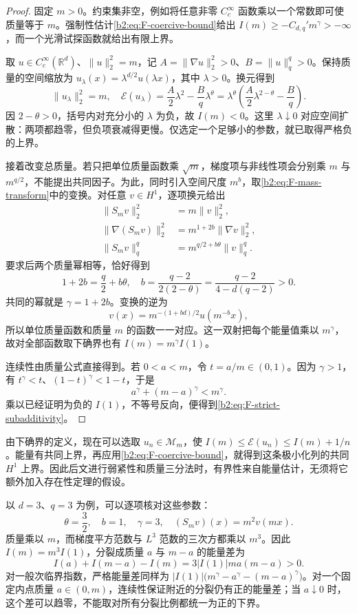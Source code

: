 \begin{proof}
固定 \(m>0\)。约束集非空，例如将任意非零 \(C_c^\infty\) 函数乘以一个常数即可使质量等于 \(m\)。强制性估计\eqref{b2:eq:F-coercive-bound}给出 \(I(m)\ge-C_{d,q}'m^\gamma> -\infty\)，而一个光滑试探函数就给出有限上界。

取 \(u\in C_c^\infty(\mathbb R^d)\)、\(\|u\|_2^2=m\)，记
\(A=\|\nabla u\|_2^2>0\)、\(B=\|u\|_q^q>0\)。保持质量的空间缩放为
\(u_\lambda(x)=\lambda^{d/2}u(\lambda x)\)，其中 \(\lambda>0\)。换元得到
\[
 \|u_\lambda\|_2^2=m,
 \quad
 \mathcal E(u_\lambda)=\frac A2\lambda^2-\frac Bq\lambda^\theta
 =\lambda^\theta\left(\frac A2\lambda^{2-\theta}-\frac Bq\right).
\]
因 \(2-\theta>0\)，括号内对充分小的 \(\lambda\) 为负，故 \(I(m)<0\)。这里 \(\lambda\downarrow0\) 对应空间扩散：两项都趋零，但负项衰减得更慢。仅选定一个足够小的参数，就已取得严格负的上界。

接着改变总质量。若只把单位质量函数乘 \(\sqrt m\)，梯度项与非线性项会分别乘 \(m\) 与 \(m^{q/2}\)，不能提出共同因子。为此，同时引入空间尺度 \(m^b\)，取\eqref{b2:eq:F-mass-transform}中的变换。对任意 \(v\in H^1\)，逐项换元给出
\[
 \begin{aligned}
 \|S_m v\|_2^2&=m\|v\|_2^2,\\
 \|\nabla(S_m v)\|_2^2&=m^{1+2b}\|\nabla v\|_2^2,\\
 \|S_m v\|_q^q&=m^{q/2+b\theta}\|v\|_q^q.
 \end{aligned}
\]
要求后两个质量幂相等，恰好得到
\[
 1+2b=\frac q2+b\theta,
 \quad
 b=\frac{q-2}{2(2-\theta)}
   =\frac{q-2}{4-d(q-2)}>0.
\]
共同的幂就是 \(\gamma=1+2b\)。变换的逆为
\[
 v(x)=m^{-(1+bd)/2}u(m^{-b}x),
\]
所以单位质量函数和质量 \(m\) 的函数一一对应。这一双射把每个能量值乘以 \(m^\gamma\)，故对全部函数取下确界也有 \(I(m)=m^\gamma I(1)\)。

连续性由质量公式直接得到。若 \(0<a<m\)，令 \(t=a/m\in(0,1)\)。因为 \(\gamma>1\)，有
\(t^\gamma<t\)、\((1-t)^\gamma<1-t\)，于是
\[
 a^\gamma+(m-a)^\gamma<m^\gamma.
\]
乘以已经证明为负的 \(I(1)\)，不等号反向，便得到\eqref{b2:eq:F-strict-subadditivity}。
\end{proof}

由下确界的定义，现在可以选取 \(u_n\in\mathcal M_m\)，使
\(I(m)\le\mathcal E(u_n)\le I(m)+1/n\)。能量有共同上界，再应用\eqref{b2:eq:F-coercive-bound}，就得到这条极小化列的共同 \(H^1\) 上界。因此后文进行弱紧性和质量三分法时，有界性来自能量估计，无须将它额外加入存在性定理的假设。

\ProseParagraphBreak
以 \(d=3\)、\(q=3\) 为例，可以逐项核对这些参数：
\[
 \theta=\frac32,
 \quad b=1,
 \quad\gamma=3,
 \quad(S_m v)(x)=m^2v(mx).
\]
质量乘以 \(m\)，而梯度平方范数与 \(L^3\) 范数的三次方都乘以 \(m^3\)。因此 \(I(m)=m^3I(1)\)，分裂成质量 \(a\) 与 \(m-a\) 的能量差为
\[
 I(a)+I(m-a)-I(m)
 =3|I(1)|ma(m-a)>0.
\]
对一般次临界指数，严格能量差同样为
\(|I(1)|\bigl(m^\gamma-a^\gamma-(m-a)^\gamma\bigr)\)。对一个固定内点质量 \(a\in(0,m)\)，连续性保证附近的分裂仍有正的能量差；当 \(a\downarrow0\) 时，这个差可以趋零，不能取对所有分裂比例都统一为正的下界。

